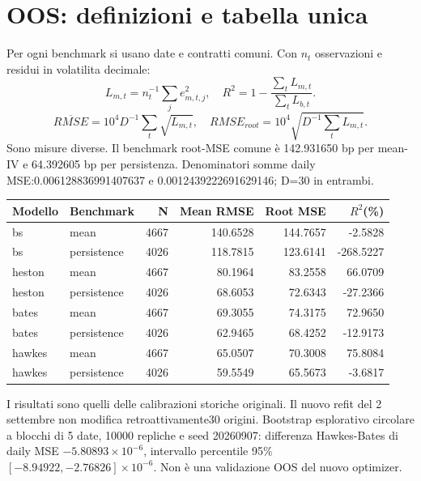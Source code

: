 \documentclass[10pt,a4paper]{article}
\begin{document}
\section{OOS: definizioni e tabella unica}
Per ogni benchmark si usano date e contratti comuni. Con $n_t$ osservazioni e residui in volatilita decimale:
\[L_{m,t}=n_t^{-1}\sum_j e_{m,t,j}^2,\quad R^2=1-\frac{\sum_t L_{m,t}}{\sum_t L_{b,t}}.\]
\[\overline{RMSE}=10^4D^{-1}\sum_t\sqrt{L_{m,t}},\quad RMSE_{root}=10^4\sqrt{D^{-1}\sum_tL_{m,t}}.\]
Sono misure diverse. Il benchmark root-MSE comune è 142.931650 bp per mean-IV e 64.392605 bp per persistenza. Denominatori somme daily MSE:0.006128836991407637 e 0.0012439222691629146; D=30 in entrambi.
\begin{center}\small\begin{tabular}{llrrrr}\toprule
Modello & Benchmark & N & Mean RMSE & Root MSE & $R^2$(\%)\\\midrule
bs & mean & 4667 & 140.6528 & 144.7657 & -2.5828 \\
bs & persistence & 4026 & 118.7815 & 123.6141 & -268.5227 \\
heston & mean & 4667 & 80.1964 & 83.2558 & 66.0709 \\
heston & persistence & 4026 & 68.6053 & 72.6343 & -27.2366 \\
bates & mean & 4667 & 69.3055 & 74.3175 & 72.9650 \\
bates & persistence & 4026 & 62.9465 & 68.4252 & -12.9173 \\
hawkes & mean & 4667 & 65.0507 & 70.3008 & 75.8084 \\
hawkes & persistence & 4026 & 59.5549 & 65.5673 & -3.6817 \\
\bottomrule\end{tabular}\end{center}
I risultati sono quelli delle calibrazioni storiche originali. Il nuovo refit del 2 settembre non modifica retroattivamente30 origini. Bootstrap esplorativo circolare a blocchi di 5 date, 10000 repliche e seed 20260907: differenza Hawkes-Bates di daily MSE $-5.80893\times10^{-6}$, intervallo percentile 95\% $[-8.94922,-2.76826]\times10^{-6}$. Non è una validazione OOS del nuovo optimizer.
\end{document}
